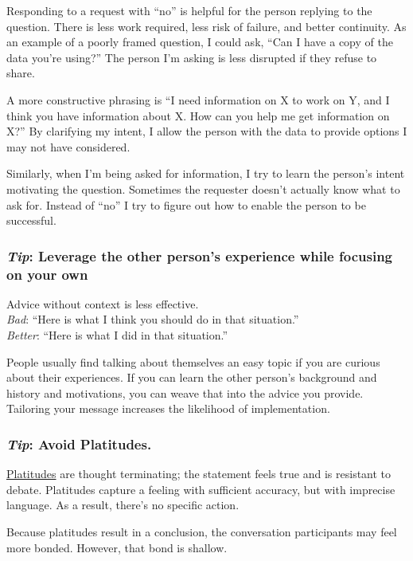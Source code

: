 Responding to a request with ``no'' is helpful for the person replying to the question. There is less work required, less risk of failure, and better continuity. As an example of a poorly framed question, I could ask, ``Can I have a copy of the data you're using?'' The person I'm asking is less disrupted if they refuse to share. 

A more constructive phrasing is ``I need information on X to work on Y, and I think you have information about X. How can you help me get information on X?'' By clarifying my intent, I allow the person with the data to provide options I may not have considered.

Similarly, when I'm being asked for information, I try to learn the person's intent motivating the question. Sometimes the requester doesn't actually know what to ask for. Instead of ``no'' I try to figure out how to enable the person to be successful. 

\subsubsection*{\textit{Tip}: Leverage the other person's experience while focusing on your own\label{sec:advice}}

Advice without context is less effective.\\
\textit{Bad}: ``Here is what I think you should do in that situation.''\\
\textit{Better}: ``Here is what I did in that situation.''

People usually find talking about themselves an easy topic if you are curious about their experiences. 
If you can learn the other person's background and history and motivations, you can weave that into the advice you provide. 
Tailoring your message increases the likelihood of implementation. 

\subsubsection*{\textit{Tip}: Avoid Platitudes\label{sec:platitudes}.}
\href{https://en.wikipedia.org/wiki/Platitude}{Platitudes} are \gls{thought terminating}; the statement feels true and is resistant to debate. Platitudes capture a feeling with sufficient accuracy, but with imprecise language. As a result, there's no specific action.

Because platitudes result in a conclusion, the conversation participants may feel more bonded. However, that bond is shallow.

